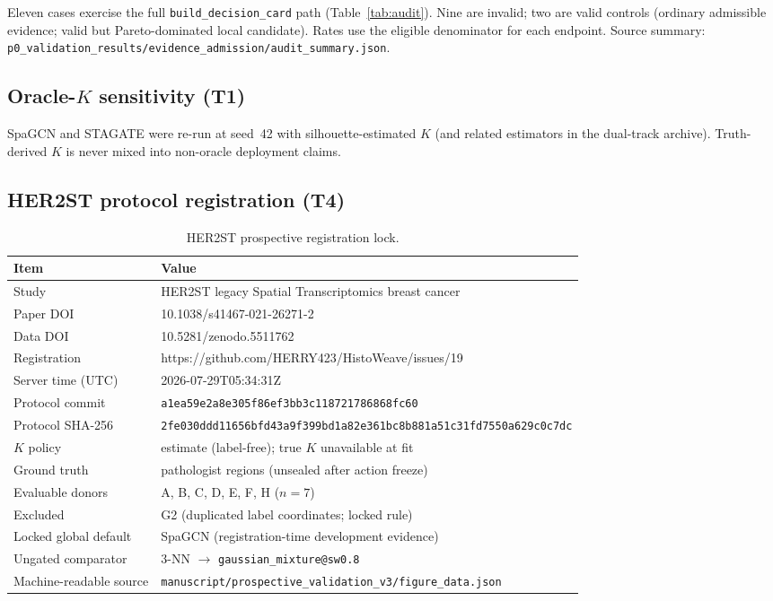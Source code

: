 \documentclass[11pt]{article}
\begin{document}
Eleven cases exercise the full \texttt{build\_decision\_card} path
(Table~\ref{tab:audit}). Nine are invalid; two are valid controls (ordinary
admissible evidence; valid but Pareto-dominated local candidate). Rates use the
eligible denominator for each endpoint. Source summary:
\texttt{p0\_validation\_results/evidence\_admission/audit\_summary.json}.

\subsection{Oracle-\(K\) sensitivity (T1)}

SpaGCN and STAGATE were re-run at seed~42 with silhouette-estimated \(K\)
(and related estimators in the dual-track archive). Truth-derived \(K\) is
never mixed into non-oracle deployment claims.

\subsection{HER2ST protocol registration (T4)}

\begin{table}[ht]
\centering
\caption{HER2ST prospective registration lock.
\label{tab:si-her2-reg}}
\begin{tabular}{@{}lp{}@{}}
\toprule
Item & Value \\
\midrule
Study & HER2ST legacy Spatial Transcriptomics breast cancer \\
Paper DOI & 10.1038/s41467-021-26271-2 \\
Data DOI & 10.5281/zenodo.5511762 \\
Registration & https://github.com/HERRY423/HistoWeave/issues/19 \\
Server time (UTC) & 2026-07-29T05:34:31Z \\
Protocol commit & \texttt{a1ea59e2a8e305f86ef3bb3c118721786868fc60} \\
Protocol SHA-256 &
\texttt{2fe030ddd11656bfd43a9f399bd1a82e361bc8b881a51c31fd7550a629c0c7dc} \\
\(K\) policy & estimate (label-free); true \(K\) unavailable at fit \\
Ground truth & pathologist regions (unsealed after action freeze) \\
Evaluable donors & A, B, C, D, E, F, H ($n=7$) \\
Excluded & G2 (duplicated label coordinates; locked rule) \\
Locked global default & SpaGCN (registration-time development evidence) \\
Ungated comparator & 3-NN $\rightarrow$ \texttt{gaussian\_mixture@sw0.8} \\
Machine-readable source &
\texttt{manuscript/prospective\_validation\_v3/figure\_data.json} \\
\bottomrule
\end{tabular}
\end{table}
\end{document}
